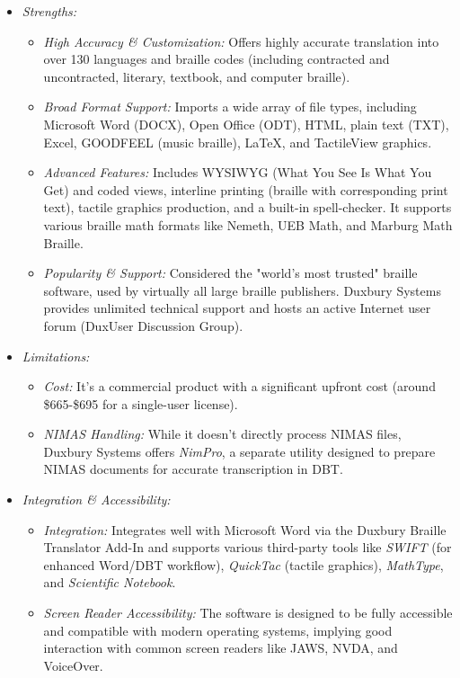 \begin{itemize}
    \item \emph{Strengths:}
    \begin{itemize}
        \item \emph{High Accuracy \& Customization:} Offers highly accurate translation into over 130 languages and braille codes (including contracted and uncontracted, literary, textbook, and computer braille)\footnotemark{}.
        \item \emph{Broad Format Support:} Imports a wide array of file types, including Microsoft Word (DOCX), Open Office (ODT), HTML, plain text (TXT), Excel, GOODFEEL (music braille), LaTeX, and TactileView graphics\footnotemark{}.
        \item \emph{Advanced Features:} Includes WYSIWYG (What You See Is What You Get) and coded views, interline printing (braille with corresponding print text), tactile graphics production, and a built-in spell-checker. It supports various braille math formats like Nemeth, UEB Math, and Marburg Math Braille.
        \item \emph{Popularity \& Support:} Considered the "world's most trusted" braille software, used by virtually all large braille publishers\footnotemark{}. Duxbury Systems provides unlimited technical support and hosts an active Internet user forum (DuxUser Discussion Group).
    \end{itemize}
    \item \emph{Limitations:}
    \begin{itemize}
        \item \emph{Cost:} It's a commercial product with a significant upfront cost (around \$665-\$695 for a single-user license)\footnotemark{}.
        \item \emph{NIMAS Handling:} While it doesn't directly process NIMAS files, Duxbury Systems offers \emph{NimPro}, a separate utility designed to prepare NIMAS documents for accurate transcription in DBT\footnotemark{}.
    \end{itemize}
    \item \emph{Integration \& Accessibility:}
    \begin{itemize}
        \item \emph{Integration:} Integrates well with Microsoft Word via the Duxbury Braille Translator Add-In and supports various third-party tools like \emph{SWIFT} (for enhanced Word/DBT workflow), \emph{QuickTac} (tactile graphics), \emph{MathType}, and \emph{Scientific Notebook}.
        \item \emph{Screen Reader Accessibility:} The software is designed to be fully accessible and compatible with modern operating systems, implying good interaction with common screen readers like JAWS, NVDA, and VoiceOver.
    \end{itemize}
\end{itemize}

